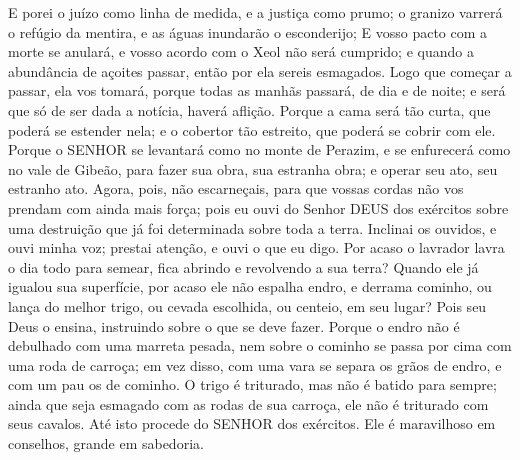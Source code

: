 {
E porei o juízo como linha de medida, e a justiça como prumo; o granizo varrerá o refúgio da mentira, e as águas inundarão o esconderijo;
E vosso pacto com a morte se anulará, e vosso acordo com o Xeol não será cumprido; e quando a abundância de açoites passar, então por ela sereis esmagados.
Logo que começar a passar, ela vos tomará, porque todas as manhãs passará, de dia e de noite; e será que só de ser dada a notícia,
{} haverá aflição.
Porque a cama será tão curta, que
{} poderá se estender nela; e o cobertor tão estreito, que
{} poderá se cobrir com ele.
Porque o SENHOR se levantará como no monte de Perazim, e se enfurecerá como no vale de Gibeão, para fazer sua obra, sua estranha obra; e operar seu ato, seu estranho ato.
Agora, pois, não escarneçais, para que vossas cordas não vos prendam com ainda mais força; pois eu ouvi do Senhor DEUS dos exércitos sobre uma destruição que já foi determinada sobre toda a terra.
Inclinai os ouvidos, e ouvi minha voz; prestai atenção, e ouvi o que eu digo.
Por acaso o lavrador lavra o dia todo para semear,
{} fica
{} abrindo e revolvendo a sua terra?
Quando ele já igualou sua superfície, por acaso ele não espalha endro, e derrama cominho, ou lança do melhor trigo, ou cevada escolhida, ou centeio,
{} em seu lugar?
Pois seu Deus o ensina, instruindo sobre o que se deve fazer.
Porque o endro não é debulhado com uma marreta pesada, nem sobre o cominho se passa por cima com uma roda de carroça; em vez disso, com uma vara se separa os grãos de endro, e com um pau os de cominho.
O trigo é triturado, mas não é batido para sempre; ainda que seja esmagado com as rodas de sua carroça, ele não é triturado com seus cavalos.
Até isto procede do SENHOR dos exércitos. Ele é maravilhoso em conselhos,
{} grande em sabedoria.

}
